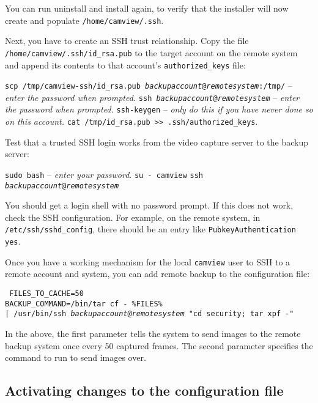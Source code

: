     You can run uninstall and install again, to verify that the installer
    will now create and populate \texttt{/home/camview/.ssh}.

    Next, you have to create an SSH trust relationship.  Copy the file
    \texttt{/home/camview/.ssh/id\_rsa.pub} to the target account on the
    remote system and append its contents to that account's \texttt{authorized\_keys}
    file:

    \BI
    \I \texttt{scp /tmp/camview-ssh/id\_rsa.pub \emph{backupaccount}@\emph{remotesystem}:/tmp/}
       -- \emph{enter the password when prompted.}
    \I \texttt{ssh \emph{backupaccount}@\emph{remotesystem}}
       -- \emph{enter the password when prompted.}
    \I \texttt{ssh-keygen}
       -- \emph{only do this if you have never done so on this account.}
    \I \texttt{cat /tmp/id\_rsa.pub >> .ssh/authorized\_keys}.
    \EI

    Test that a trusted SSH login works from the video capture server to the backup
    server:

    \BI
    \I \texttt{sudo bash} -- \emph{enter your password}.
    \I \texttt{su - camview}
    \I \texttt{ssh \emph{backupaccount}@\emph{remotesystem}}
    \EI

    You should get a login shell with no password prompt.  If this
    does not work, check the SSH configuration.  For example, on
    the remote system, in \texttt{/etc/ssh/sshd\_config}, there
    should be an entry like \texttt{PubkeyAuthentication yes}.

    Once you have a working mechanism for the local \texttt{camview}
    user to SSH to a remote account and system, you can add remote backup
    to the configuration file:

    \texttt{%
    FILES\_TO\_CACHE=50\\
    BACKUP\_COMMAND=/bin/tar cf - \%FILES\%\BS{}\\
      | /usr/bin/ssh \emph{backupaccount}@\emph{remotesystem} "cd security; tar xpf -"
    }

    In the above, the first parameter tells the system to send images to the
    remote backup system once every 50 captured frames.  The second parameter
    specifies the command to run to send images over.

  \subsection{Activating changes to the configuration file}

